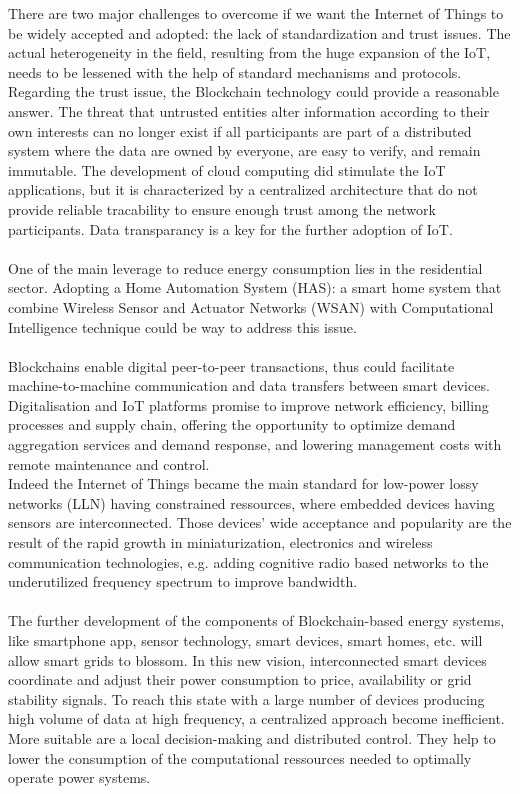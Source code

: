 \documentclass[11pt]{article}
\begin{document}
There are two major challenges to overcome if we want the Internet of Things to be widely accepted and adopted: the lack of standardization and trust issues. The actual heterogeneity in the field, resulting from the huge expansion of the IoT, needs to be lessened with the help of standard mechanisms and protocols. Regarding the trust issue, the Blockchain technology could provide a reasonable answer. The threat that untrusted entities alter information according to their own interests can no longer exist if all participants are part of a distributed system where the data are owned by everyone, are easy to verify, and remain immutable. The development of cloud computing did stimulate the IoT applications, but it is characterized by a centralized architecture that do not provide reliable tracability to ensure enough trust among the network participants. Data transparancy is a key for the further adoption of IoT.\cite{21}\\\\
One of the main leverage to reduce energy consumption lies in the residential sector. Adopting a Home Automation System (HAS): a smart home system that combine Wireless Sensor and Actuator Networks (WSAN) with Computational Intelligence technique could be way to address this issue.\cite{15}\\\\
Blockchains enable digital peer-to-peer transactions, thus could facilitate machine-to-machine communication and data transfers between smart devices. Digitalisation and IoT platforms promise to improve network efficiency, billing processes and supply chain, offering the opportunity to optimize demand aggregation services and demand response, and lowering management costs with remote maintenance and control.\cite{8}\\
Indeed the Internet of Things became the main standard for low-power lossy networks (LLN) having constrained ressources, where embedded devices having sensors are interconnected. Those devices' wide acceptance and popularity are the result of the rapid growth in miniaturization, electronics and wireless communication technologies, e.g. adding cognitive radio based networks to the underutilized frequency spectrum to improve bandwidth.\cite{9}\\\\
The further development of the components of Blockchain-based energy systems, like smartphone app, sensor technology, smart devices, smart homes, etc. will allow smart grids to blossom. In this new vision, interconnected smart devices coordinate and adjust their power consumption to price, availability or grid stability signals. To reach this state with a large number of devices producing high volume of data at high frequency, a centralized approach become inefficient. More suitable are a local decision-making and distributed control. They help to lower the consumption of the computational ressources needed to optimally operate power systems.\cite{8}\\
\end{document}
